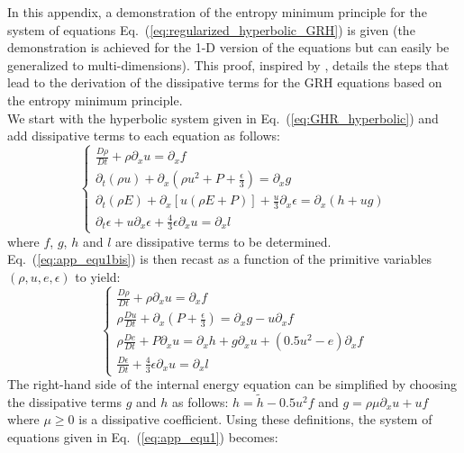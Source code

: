 \documentclass[review]{elsarticle}
\newcommand{\eqt}[1]{Eq.~(\ref{#1})}                     %
\begin{document}
\begin{appendices}
In this appendix, a demonstration of the entropy minimum principle for the system of equations \eqt{eq:regularized_hyperbolic_GRH} is given (the demonstration is achieved for the 1-D version of the equations but can easily be generalized to multi-dimensions). This proof, inspired by \cite{jlg}, details the steps that lead to the derivation of the dissipative terms for the GRH equations based on the entropy minimum principle.\\
We start with the hyperbolic system given in \eqt{eq:GHR_hyperbolic} and add dissipative terms to each equation as follows:
\begin{equation}
\label{eq:app_equ1bis}
\left\{
\begin{array}{llll}
\frac{D \rho}{Dt} + \rho \partial_x u = \partial_x f \\
\partial_t (\rho u) + \partial_x \left(\rho u^2 +  P + \frac{\epsilon}{3} \right) = \partial_x g  \\
\partial_t (\rho E) + \partial_x \left[ u \left( \rho E +P \right) \right] + \frac{u}{3} \partial_x \epsilon = \partial_x \left( h + ug \right) \\
\partial_t \epsilon + u \partial_x \epsilon + \frac{4}{3} \epsilon \partial_x u = \partial_x l
\end{array}
\right.
\end{equation}
where $f$, $g$, $h$ and $l$ are dissipative terms to be determined.
\eqt{eq:app_equ1bis} is then recast as a function of the primitive variables $(\rho, u, e, \epsilon)$ to yield:
\begin{equation}
\label{eq:app_equ1}
\left\{
\begin{array}{llll}
\frac{D \rho}{Dt} + \rho \partial_x u = \partial_x f \\
\rho \frac{Du}{Dt} + \partial_x \left( P + \frac{\epsilon}{3} \right) = \partial_x g - u \partial_x f  \\
\rho \frac{De}{Dt} + P \partial_x u = \partial_x h + g \partial_x u + \left( 0.5 u^2 - e \right) \partial_x f \\
\frac{D\epsilon}{Dt} + \frac{4}{3} \epsilon \partial_x u = \partial_x l
\end{array}
\right.
\end{equation}
The right-hand side of the internal energy equation can be simplified by choosing the dissipative terms $g$ and $h$ as follows: $h = \tilde{h} -0.5 u^2 f$ and $g = \rho \mu \partial_x u + uf$ where $\mu \geq 0$ is a dissipative coefficient. Using these definitions, the system of equations given in \eqt{eq:app_equ1} becomes:

\end{appendices}
\end{document}
